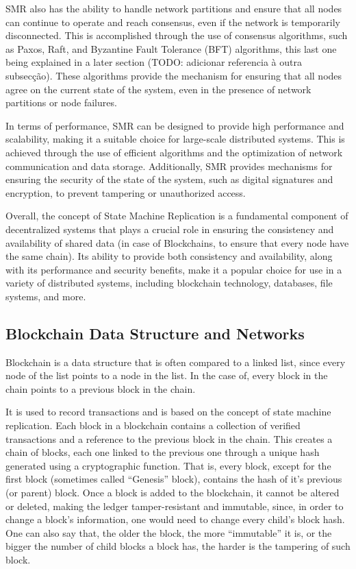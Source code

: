 SMR also has the ability to handle network partitions and ensure that all nodes can continue to operate and reach consensus, even if the network is temporarily disconnected. This is accomplished through the use of consensus algorithms, such as Paxos, Raft, and Byzantine Fault Tolerance (BFT) algorithms, this last one being explained in a later section (TODO: adicionar referencia à outra subsecção). These algorithms provide the mechanism for ensuring that all nodes agree on the current state of the system, even in the presence of network partitions or node failures.

In terms of performance, SMR can be designed to provide high performance and scalability, making it a suitable choice for large-scale distributed systems.
This is achieved through the use of efficient algorithms and the optimization of network communication and data storage. Additionally, SMR provides mechanisms for ensuring the security of the state of the system, such as digital signatures and encryption, to prevent tampering or unauthorized access.

Overall, the concept of State Machine Replication is a fundamental component of decentralized systems that plays a crucial role in ensuring the consistency and availability of shared data (in case of Blockchains, to ensure that every node have the same chain).
Its ability to provide both consistency and availability, along with its performance and security benefits, make it a popular choice for use in a variety of distributed systems, including blockchain technology, databases, file systems, and more.


\subsection*{\textbf{Blockchain Data Structure and Networks}}
Blockchain is a data structure that is often compared to a linked list, since every node of the list points to a node in the list. In the case of, every block in the chain points to a previous block in the chain.

It is used to record transactions and is based on the concept of state machine replication.
Each block in a blockchain contains a collection of verified transactions and a reference to the previous block in the chain.
This creates a chain of blocks, each one linked to the previous one through a unique hash generated using a cryptographic function.
That is, every block, except for the first block (sometimes called ``Genesis'' block), contains the hash of it's previous (or parent) block.
Once a block is added to the blockchain, it cannot be altered or deleted, making the ledger tamper-resistant and immutable, since, in order to change a block's information, one would need to change every child's block hash.
One can also say that, the older the block, the more ``immutable'' it is, or the bigger the number of child blocks a block has, the harder is the tampering of such block.

